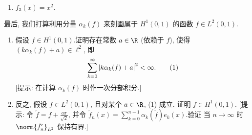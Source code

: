 \begin{exercise}
\begin{enumerate}[label=\arabic*., leftmargin=2.2em, itemsep=0.3em, start=9]
\begin{enumerate}[label=(\alph*), leftmargin=2.2em, itemsep=0.2em]
	      	\item $f_3(x)=x^2$.
	      \end{enumerate}
\end{enumerate}
最后, 我们打算利用分量 $\alpha_k(f)$ 来刻画属于 $H^1(0,1)$ 的函数
$f\in L^2(0,1)$.
\begin{enumerate}[label=\arabic*., leftmargin=2.2em, itemsep=0.3em, start=10]
	\item 假设 $f\in H^1(0,1)$.证明存在常数 $a\in\R$ (依赖于 $f$),
	      使得 $(k\alpha_k(f)+a)\in\ell^2$, 即
	      \begin{equation}
	      \sum_{k=0}^\infty\left|k\alpha_k(f)+a\right|^2<\infty.
	      \tag{1}
	      \end{equation}
	      [提示: 在计算 $\alpha_k(f)$ 时作一次分部积分.]
	\item 反之, 假设 $f\in L^2(0,1)$, 且对某个 $a\in\R$, (1) 成立.
	      证明 $f\in H^1(0,1)$.
	      [提示: 令 $\tilde f=f+\frac{a\pi}{\sqrt2}$, 并令
	      $\tilde f_n(x)=\sum_{k=0}^{n-1}\alpha_k(\tilde f)e_k(x)$.验证
	      当 $n\to\infty$ 时 $\norm{\tilde f_n'}_{L^2}$ 保持有界.]
\end{enumerate}
\end{exercise}

